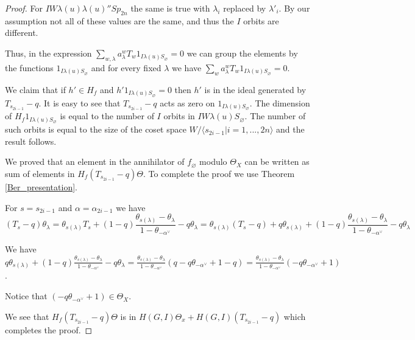 \documentclass[10pt,a4paper]{amsart}
\renewcommand{\emptyset}{\varnothing}
\begin{document}
\begin{proof}
        For $IW\lambda(u)\lambda(u)''Sp_{2n}$ the same is true with $\lambda_i$ replaced by $\lambda'_i$. By our assumption not all of these values are the same, and thus the $I$ orbits are different.

        Thus, in the expression $\sum_{w,\lambda} a_\lambda^w T_w1_{I\lambda(u)S_\emptyset}=0$ we can group the elements by the functions $1_{I\lambda(u)S_\emptyset}$ and for every fixed $\lambda$ we have $\sum_w a_\lambda^w T_w1_{I\lambda(u)S_\emptyset}=0$. 

        We claim that if $h'\in H_f$ and $h'1_{I\lambda(u)S_\emptyset}=0$ then $h'$ is in the ideal generated by $T_{s_{2i-1}}-q$. It is easy to see that $T_{s_{2i-1}}-q$ acts as zero on $1_{I\lambda(u)S_\emptyset}$. The dimension of $H_f1_{I\lambda(u)S_\emptyset}$ is equal to the number of $I$ orbits in $IW\lambda(u)S_\emptyset$. The number of such orbits is equal to the size of the coset space $W/\langle s_{2i-1}|i=1,...,2n\rangle$ and the result follows. 

        We proved that an element in the annihilator of $f_\emptyset$ modulo $\Theta_X$ can be written as sum of elements in $H_f(T_{s_{2i-1}}-q)\Theta$. To complete the proof we use Theorem \ref{Ber_presentation}.

        For $s=s_{2i-1}$ and $\alpha=\alpha_{2i-1}$ we have $$(T_s-q)\theta_\lambda=\theta_{s(\lambda)}T_s+(1-q)\frac{\theta_{s(\lambda)}-\theta_{\lambda}}{1-\theta_{-\alpha^\vee}}-q\theta_\lambda=\theta_{s(\lambda)}(T_s-q)+q\theta_{s(\lambda)}+(1-q)\frac{\theta_{s(\lambda)}-\theta_{\lambda}}{1-\theta_{-\alpha^\vee}}-q\theta_\lambda$$
        
        We have $q\theta_{s(\lambda)}+(1-q)\frac{\theta_{s(\lambda)}-\theta_{\lambda}}{1-\theta_{-\alpha^\vee}}-q\theta_\lambda=\frac{\theta_{s(\lambda)}-\theta_{\lambda}}{1-\theta_{-\alpha^\vee}}(q-q\theta_{-\alpha^\vee}+1-q)=\frac{\theta_{s(\lambda)}-\theta_{\lambda}}{1-\theta_{-\alpha^\vee}}(-q\theta_{-\alpha^\vee}+1)$. 

        Notice that $(-q\theta_{-\alpha^\vee}+1)\in \Theta_X$.
        
        We see that $H_f(T_{s_{2i-1}}-q)\Theta$ is in $H(G,I)\Theta_x+H(G,I)(T_{s_{2i-1}}-q)$ which completes the proof.
        
    \end{proof}
\end{document}
